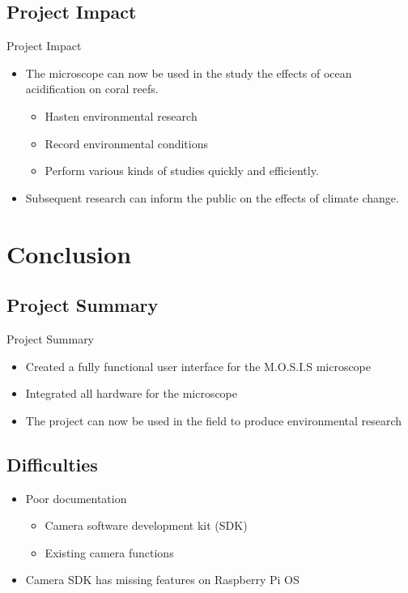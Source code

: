 \documentclass[17pt, aspectratio=169]{beamer}
\begin{document}
\subsection*{Project Impact}
\begin{frame}{Project Impact}
	\begin{itemize}
		\item The microscope can now be used in the study the effects of ocean acidification on coral reefs.
		      \begin{itemize}
			      \item Hasten environmental research
			      \item Record environmental conditions
			      \item Perform various kinds of studies quickly and efficiently.
		      \end{itemize}
		\item Subsequent research can inform the public on the effects of climate change.
	\end{itemize}
\end{frame}
\section{Conclusion}
\subsection{Project Summary}
\begin{frame}{Project Summary}
	\begin{itemize}
		\item Created a fully functional user interface for the M.O.S.I.S microscope
		\item Integrated all hardware for the microscope
		\item The project can now be used in the field to produce environmental research
	\end{itemize}
\end{frame}
\subsection{Difficulties}
\begin{frame}
	\begin{itemize}
		\item Poor documentation
		      \begin{itemize}
			      \item Camera software development kit (SDK)
			      \item Existing camera functions
		      \end{itemize}
		\item Camera SDK has missing features on Raspberry Pi OS
	\end{itemize}
\end{frame}
\end{document}
